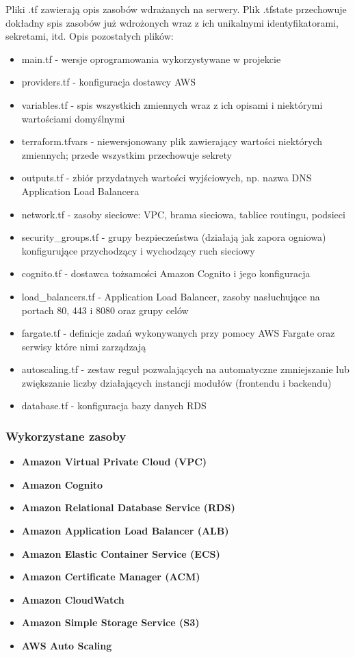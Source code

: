 \documentclass[../../main.tex]{subfiles}
\begin{document}
        Pliki .tf zawierają opis zasobów wdrażanych na serwery. Plik .tfstate przechowuje dokładny spis zasobów już wdrożonych wraz z ich unikalnymi identyfikatorami, sekretami, itd. Opis pozostałych plików:
        \begin{itemize}
            \item main.tf - wersje oprogramowania wykorzystywane w projekcie
            \item providers.tf - konfiguracja dostawcy AWS
            \item variables.tf - spis wszystkich zmiennych wraz z ich opisami i niektórymi wartościami domyślnymi
            \item terraform.tfvars - niewersjonowany plik zawierający wartości niektórych zmiennych; przede wszystkim przechowuje sekrety
            \item outputs.tf - zbiór przydatnych wartości wyjściowych, np. nazwa DNS Application Load Balancera
            \item network.tf - zasoby sieciowe: VPC, brama sieciowa, tablice routingu, podsieci
            \item security\_groups.tf - grupy bezpieczeństwa (działają jak zapora ogniowa) konfigurujące przychodzący i wychodzący ruch sieciowy
            \item cognito.tf - dostawca tożsamości Amazon Cognito i jego konfiguracja
            \item load\_balancers.tf - Application Load Balancer, zasoby nasłuchujące na portach 80, 443 i 8080 oraz grupy celów
            \item fargate.tf - definicje zadań wykonywanych przy pomocy AWS Fargate oraz serwisy które nimi zarządzają
            \item autoscaling.tf - zestaw reguł pozwalających na automatyczne zmniejszanie lub zwiększanie liczby działających instancji modułów (frontendu i backendu)
            \item database.tf - konfiguracja bazy danych RDS
        \end{itemize}
    \subsubsection{Wykorzystane zasoby}
        \begin{itemize}
            \item \textbf{Amazon Virtual Private Cloud (VPC)}
            \item \textbf{Amazon Cognito}
            \item \textbf{Amazon Relational Database Service (RDS)}
            \item \textbf{Amazon Application Load Balancer (ALB)}
            \item \textbf{Amazon Elastic Container Service (ECS)}
            \item \textbf{Amazon Certificate Manager (ACM)}
            \item \textbf{Amazon CloudWatch}
            \item \textbf{Amazon Simple Storage Service (S3)}
            \item \textbf{AWS Auto Scaling}
        \end{itemize}
\end{document}
